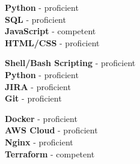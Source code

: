 \documentclass[9pt]{developercv} %
\begin{document}
\begin{minipage}[t]{0.3\textwidth}
	\vspace{-\baselineskip} %

	\textbf{Python} - proficient\\
	\textbf{SQL} - proficient\\
	\textbf{JavaScript} - competent\\
	\textbf{HTML/CSS} - proficient\\
\end{minipage}
\hfill
\begin{minipage}[t]{0.3\textwidth}
	\vspace{-\baselineskip} %
	
	\textbf{Shell/Bash Scripting} - proficient\\
	\textbf{Python} - proficient\\
	\textbf{JIRA} - proficient\\
	\textbf{Git} - proficient\\
\end{minipage}
\hfill
\begin{minipage}[t]{0.3\textwidth}
	\vspace{-\baselineskip} %
	
	\textbf{Docker} - proficient\\
	\textbf{AWS Cloud} - proficient\\
	\textbf{Nginx} - proficient\\
	\textbf{Terraform} - competent\\
\end{minipage}
\end{document}
